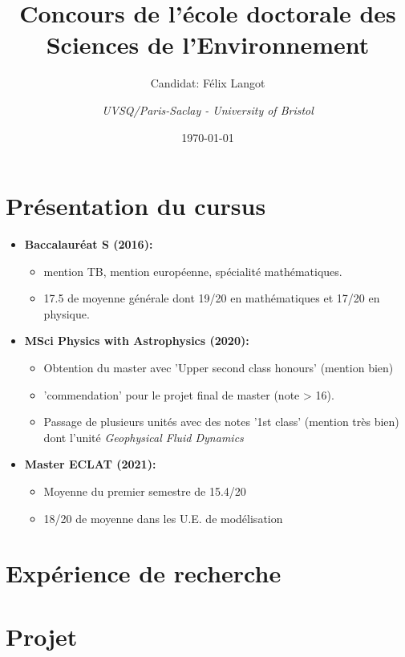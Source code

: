 \documentclass[10pt]{beamer}
\title{Concours de l'école doctorale des Sciences de l'Environnement}
\subtitle{Candidat: Félix Langot}
\date{\today}
\author{\textit{UVSQ/Paris-Saclay - University of Bristol}}
\institute{}
\begin{document}
\maketitle

\section*{Présentation du cursus}
\begin{frame}{\secname}
    \begin{itemize}
        \item \textbf{Baccalauréat S (2016):} 
        \begin{itemize}
            \item mention TB, mention européenne, spécialité mathématiques.
            \item 17.5 de moyenne générale dont 19/20 en mathématiques et 17/20 en physique.
        \end{itemize} 
        \item \textbf{MSci Physics with Astrophysics (2020):} 
        \begin{itemize}
            \item Obtention du master avec 'Upper second class honours' (mention bien)
            \item 'commendation' pour le projet final de master (note > 16). 
            \item Passage de plusieurs unités avec des notes '1st class' (mention très bien) dont l'unité \textit{Geophysical Fluid Dynamics}
        \end{itemize}
        \item \textbf{Master ECLAT (2021):} 
        \begin{itemize}
            \item Moyenne du premier semestre de 15.4/20
            \item 18/20 de moyenne dans les U.E. de modélisation
        \end{itemize}
    \end{itemize}
\end{frame}

\section*{Expérience de recherche}
\begin{frame}{\secname}
    
\end{frame}

\begin{frame}{\secname}
    
\end{frame}

\section*{Projet}
\begin{frame}{\secname}
    
\end{frame}
\end{document}

